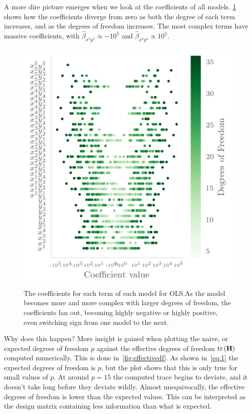 A more dire picture emerges when we look at the coefficients of all models.
\cref{fig:olscoeff} shows how the coefficients diverge from zero as both the
degree of each term increases, and as the degrees of freedom increases. The most
complex terms have massive coefficients, with \(\hat\beta_{x^{5}y^{5}} \propto
-10^{5}\) and \(\hat\beta_{x^{5}y^{4}}\propto 10^{5}\).

\begin{figure}[]
  \centering
  \includegraphics[]{figures/olscoeff.png}
  \caption{\label{fig:olscoeff} The coefficients for each term of each model for
  OLS.\@ As the model becomes more and more complex with larger degrees of
  freedom, the coefficients fan out, becoming highly negative or highly positive,
even switching sign from one model to the next. }
\end{figure}

Why does this happen? More insight is gained when plotting the naive, or expected
degrees of freedom \(p\) against the effective degrees of freedom
\(\text{tr}\left(\vb{H}\right)\) computed numerically. This is done 
in~\cref{fig:effectivedf}. As shown in~\cref{eq:1} the expected degrees of
freedom is \(p\), but the plot shows that this is only true for small values of
\(p\). At around \(p=15\) the computed trace begins to deviate, and it
doesn't take long before they deviate wildly. Almost unequivocally, the
effective degrees of freedom is lower than the expected values. This can be
interpreted as the design matrix containing less information than what is
expected.

